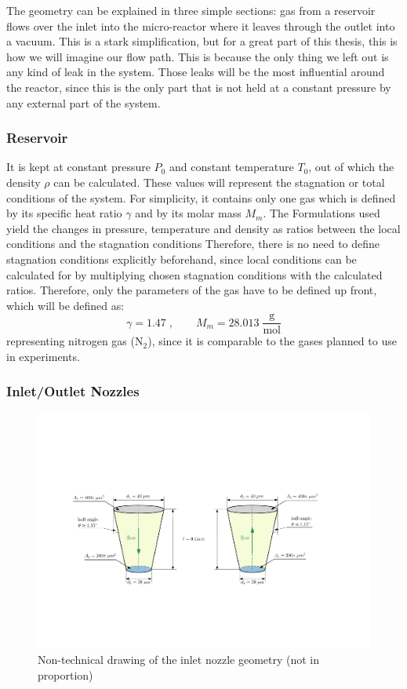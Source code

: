 	The geometry can be explained in three simple sections: gas from a reservoir flows over the inlet into the micro-reactor where it leaves through the outlet into a vacuum. 
	This is a stark simplification, but for a great part of this thesis, this is how we will imagine our flow path.
	This is because the only thing we left out is any kind of leak in the system.
	Those leaks will be the most influential around the reactor, since this is the only part that is not held at a constant pressure by any external part of the system.\\
\subsubsection*{Reservoir}

	It is kept at constant pressure $P_0$ and constant temperature $T_0$, out of which the density $\rho$ can be calculated.
	These values will represent the stagnation or total conditions of the system.
	For simplicity, it contains only one gas which is defined by its specific heat ratio $\gamma$ and by its molar mass $M_m$.
	The Formulations used yield the changes in pressure, temperature and density as ratios between the local conditions and the stagnation conditions
	Therefore, there is no need to define stagnation conditions explicitly beforehand, since local conditions can be calculated for by multiplying chosen stagnation conditions with the calculated ratios.
	Therefore, only the parameters of the gas have to be defined up front, which will be defined as:
	$$
		\gamma = 1.47\;, \qquad M_m = 28.013\; \frac{\text{g}}{\text{mol}}
	$$
	representing nitrogen gas ($\text{N}_2$), since it is comparable to the gases planned to use in experiments.
	\newpage
\subsubsection*{Inlet/Outlet Nozzles}
	\begin{figure}[H]
	    \centering
	    \includegraphics[width=\textwidth]{src/03_analytical-work/fig_inlet-nozzle-geometry.pdf}
	    \caption{Non-technical drawing of the inlet nozzle geometry (not in proportion)}
	    \label{fig:geometry-inlet-nozzle}
	\end{figure}
